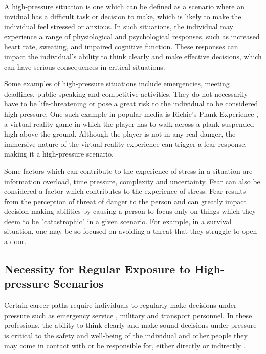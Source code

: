 \documentclass[12pt]{article}
\begin{document}
A high-pressure situation is one which can be defined as a scenario where an invidual has a difficult task or decision to make, which is likely to make the individual feel stressed or anxious. In such situations, the individual may experience a range of physiological and psychological responses, such as increased heart rate, sweating, and impaired cognitive function. These responses can impact the individual's ability to think clearly and make effective decisions, which can have serious consequences in critical situations.

Some examples of high-pressure situations include emergencies, meeting deadlines, public speaking and competitive activities. They do not necessarily have to be life-threatening or pose a great risk to the individual to be considered high-pressure. One such example in popular media is Richie's Plank Experience \cite{richiesplank}, a virtual reality game in which the player has to walk across a plank suspended high above the ground. Although the player is not in any real danger, the immersive nature of the virtual reality experience can trigger a fear response, making it a high-pressure scenario. \cite{el2023walk}

Some factors which can contribute to the experience of stress in a situation are information overload, time pressure, complexity and uncertainty. \cite{Phillips-Wren18082020} Fear can also be considered a factor which contributes to the experience of stress. \cite{klein2013effect} Fear results from the perception of threat of danger to the person and can greatly impact decision making abilities by causing a person to focus only on things which they deem to be "catastrophic" in a given scenario. \cite{chanel2009influence} For example, in a survival situation, one may be so focused on avoiding a threat that they struggle to open a door.

\subsection{Necessity for Regular Exposure to High-pressure Scenarios}

Certain career paths require individuals to regularly make decisions under pressure such as emergency service \cite{gullon2024prevalence}\cite{smith2011work}, military \cite{srivastava2023occupational}\cite{hellewell2018measuring}\cite{fear2009job} and transport \cite{jiao2023physiological}\cite{cahill2021pilot} personnel. In these professions, the ability to think clearly and make sound decisions under pressure is critical to the safety and well-being of the individual and other people they may come in contact with or be responsible for, either directly or indirectly \cite{mcfarlane2021investigating}. 
\end{document}
